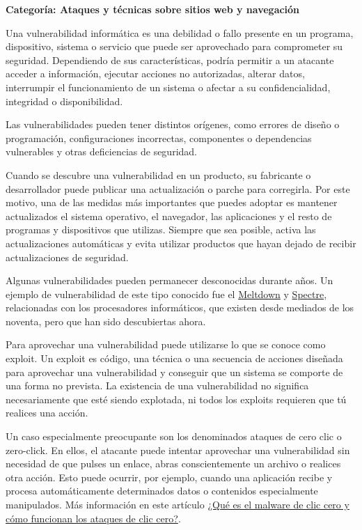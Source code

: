 \documentclass[
  spanish,
  a4paper,
  openany]{book}
\begin{document}
\textbf{Categoría: Ataques y técnicas sobre sitios web y navegación}

Una vulnerabilidad informática es una debilidad o fallo presente en un programa, dispositivo, sistema o servicio que puede ser aprovechado para comprometer su seguridad. Dependiendo de sus características, podría permitir a un atacante acceder a información, ejecutar acciones no autorizadas, alterar datos, interrumpir el funcionamiento de un sistema o afectar a su confidencialidad, integridad o disponibilidad.

Las vulnerabilidades pueden tener distintos orígenes, como errores de diseño o programación, configuraciones incorrectas, componentes o dependencias vulnerables y otras deficiencias de seguridad.

Cuando se descubre una vulnerabilidad en un producto, su fabricante o desarrollador puede publicar una actualización o parche para corregirla. Por este motivo, una de las medidas más importantes que puedes adoptar es mantener actualizados el sistema operativo, el navegador, las aplicaciones y el resto de programas y dispositivos que utilizas. Siempre que sea posible, activa las actualizaciones automáticas y evita utilizar productos que hayan dejado de recibir actualizaciones de seguridad.

Algunas vulnerabilidades pueden permanecer desconocidas durante años. Un ejemplo de vulnerabilidad de este tipo conocido fue el \href{https://es.wikipedia.org/wiki/Meltdown_(vulnerabilidad)}{Meltdown} y \href{https://es.wikipedia.org/wiki/Spectre_(vulnerabilidad)}{Spectre}, relacionadas con los procesadores informáticos, que existen desde mediados de los noventa, pero que han sido descubiertas ahora.

Para aprovechar una vulnerabilidad puede utilizarse lo que se conoce como exploit. Un exploit es código, una técnica o una secuencia de acciones diseñada para aprovechar una vulnerabilidad y conseguir que un sistema se comporte de una forma no prevista. La existencia de una vulnerabilidad no significa necesariamente que esté siendo explotada, ni todos los exploits requieren que tú realices una acción.

Un caso especialmente preocupante son los denominados ataques de cero clic o zero-click. En ellos, el atacante puede intentar aprovechar una vulnerabilidad sin necesidad de que pulses un enlace, abras conscientemente un archivo o realices otra acción. Esto puede ocurrir, por ejemplo, cuando una aplicación recibe y procesa automáticamente determinados datos o contenidos especialmente manipulados. Más información en este artículo \href{https://www.kaspersky.es/resource-center/definitions/what-is-zero-click-malware}{¿Qué es el malware de clic cero y cómo funcionan los ataques de clic cero?}.
\end{document}
